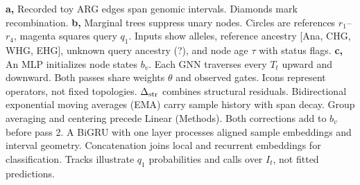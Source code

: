 \textbf{a,} Recorded toy ARG edges span genomic intervals. Diamonds mark recombination.
\textbf{b,} Marginal trees suppress unary nodes. Circles are references $r_1$--$r_4$, magenta squares query $q_1$. Inputs show alleles, reference ancestry [Ana, CHG, WHG, EHG], unknown query ancestry (?), and node age $\tau$ with status flags.
\textbf{c,} An MLP initializes node states $b_v$. Each GNN traverses every $T_t$ upward and downward. Both passes share weights $\theta$ and observed gates. Icons represent operators, not fixed topologies. $\Delta_{\rm str}$ combines structural residuals. Bidirectional exponential moving averages (EMA) carry sample history with span decay. Group averaging and centering precede Linear (Methods). Both corrections add to $b_v$ before pass 2. A BiGRU with one layer processes aligned sample embeddings and interval geometry. Concatenation joins local and recurrent embeddings for classification. Tracks illustrate $q_1$ probabilities and calls over $I_t$, not fitted predictions.
